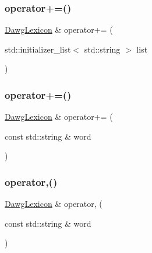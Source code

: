 \subsubsection{\texorpdfstring{operator+=()}{operator+=()}\hspace{0.1cm}{\footnotesize\ttfamily [2/3]}}
{\footnotesize\ttfamily \mbox{\hyperlink{classDawgLexicon}{Dawg\+Lexicon}} \& operator+= (\begin{DoxyParamCaption}\item[{std\+::initializer\+\_\+list$<$ std\+::string $>$}]{list }\end{DoxyParamCaption})}

\mbox{\label{classDawgLexicon_a8d7fe415402649e86e5ccbb3738d358e}} 
\subsubsection{\texorpdfstring{operator+=()}{operator+=()}\hspace{0.1cm}{\footnotesize\ttfamily [3/3]}}
{\footnotesize\ttfamily \mbox{\hyperlink{classDawgLexicon}{Dawg\+Lexicon}} \& operator+= (\begin{DoxyParamCaption}\item[{const std\+::string \&}]{word }\end{DoxyParamCaption})}

\mbox{\label{classDawgLexicon_ad749b5a8bca43259350ee643e152c2d8}} 
\subsubsection{\texorpdfstring{operator,()}{operator,()}}
{\footnotesize\ttfamily \mbox{\hyperlink{classDawgLexicon}{Dawg\+Lexicon}} \& operator, (\begin{DoxyParamCaption}\item[{const std\+::string \&}]{word }\end{DoxyParamCaption})}

\mbox{\label{classDawgLexicon_aa7c66db17666a22697ec8076716c3680}} 
